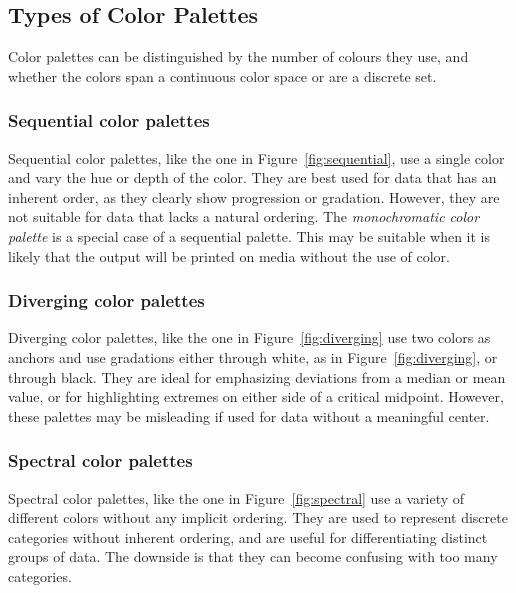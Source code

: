 \subsection*{Types of Color Palettes}

Color palettes can be distinguished by the number of colours they use, and whether the colors span a continuous color space or are a discrete set. 

\subsubsection*{Sequential color palettes}

Sequential color palettes, like the one in Figure~\ref{fig:sequential}, use a single color and vary the hue or depth of the color. They are best used for data that has an inherent order, as they clearly show progression or gradation. However, they are not suitable for data that lacks a natural ordering. The \emph{monochromatic color palette} is a special case of a sequential palette. This may be suitable when it is likely that the output will be printed on media without the use of color. 

\subsubsection*{Diverging color palettes}

Diverging color palettes, like the one in Figure~\ref{fig:diverging} use two colors as anchors and use gradations either through white, as in Figure~\ref{fig:diverging}, or through black. They are ideal for emphasizing deviations from a median or mean value, or for highlighting extremes on either side of a critical midpoint. However, these palettes may be misleading if used for data without a meaningful center.

\subsubsection*{Spectral color palettes}

Spectral color palettes, like the one in Figure~\ref{fig:spectral} use a variety of different colors without any implicit ordering. They are used to represent discrete categories without inherent ordering, and are useful for differentiating distinct groups of data. The downside is that they can become confusing with too many categories. 

